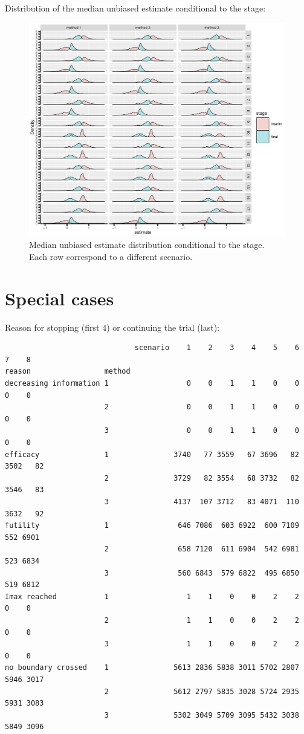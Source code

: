 \documentclass[12pt]{article}
\begin{document}
Distribution of the median unbiased estimate conditional to the stage:
\begin{figure}[!h]
\centering
\includegraphics[trim={0 0 0 0},width=1\textwidth]{./figures/gg-estimateC-density.pdf}
\caption{Median unbiased estimate distribution conditional to the stage. Each row correspond to a different scenario.}
\end{figure}

\clearpage

\section{Special cases}
\label{sec:org3eb8c71}

Reason for stopping (first 4) or continuing the trial (last):
\begin{verbatim}
                              scenario    1    2    3    4    5    6    7    8
reason                 method                                                 
decreasing information 1                  0    0    1    1    0    0    0    0
                       2                  0    0    1    1    0    0    0    0
                       3                  0    0    1    1    0    0    0    0
efficacy               1               3740   77 3559   67 3696   82 3502   82
                       2               3729   82 3554   68 3732   82 3546   83
                       3               4137  107 3712   83 4071  110 3632   92
futility               1                646 7086  603 6922  600 7109  552 6901
                       2                658 7120  611 6904  542 6981  523 6834
                       3                560 6843  579 6822  495 6850  519 6812
Imax reached           1                  1    1    0    0    2    2    0    0
                       2                  1    1    0    0    2    2    0    0
                       3                  1    1    0    0    2    2    0    0
no boundary crossed    1               5613 2836 5838 3011 5702 2807 5946 3017
                       2               5612 2797 5835 3028 5724 2935 5931 3083
                       3               5302 3049 5709 3095 5432 3038 5849 3096
\end{verbatim}
\end{document}
